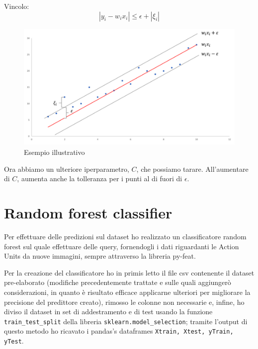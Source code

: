 Vincolo:
\begin{equation}
        | y_i - w_i x_i | \leq \epsilon + | \xi_i |
        \label{equation:21}
\end{equation}

\begin{figure}
    \centering
    \includegraphics[width=0.9\linewidth]{images/img104.png}
    \caption{Esempio illustrativo}
\end{figure}


Ora abbiamo un ulteriore iperparametro, $C$, che possiamo tarare. All'aumentare di $C$, aumenta anche la tolleranza per i punti al di fuori di $\epsilon$. 

\section{Random forest classifier}
Per effettuare delle predizioni sul dataset ho realizzato un classificatore random forest sul quale effettuare delle query, fornendogli i dati riguardanti le Action Units da nuove immagini, sempre attraverso la libreria py-feat.

Per la creazione del classificatore ho in primis letto il file csv contenente il dataset pre-elaborato (modifiche precedentemente trattate e sulle quali aggiungerò considerazioni, in quanto è risultato efficace applicarne ulteriori per migliorare la precisione del predittore creato), rimosso le colonne non necessarie e, infine, ho diviso il dataset in set di addestramento e di test usando la funzione \texttt{train_test_split} della libreria \texttt{sklearn.model_selection}; tramite l’output di questo metodo ho ricavato i pandas’s dataframes \texttt{Xtrain, Xtest, yTrain, yTest}.

